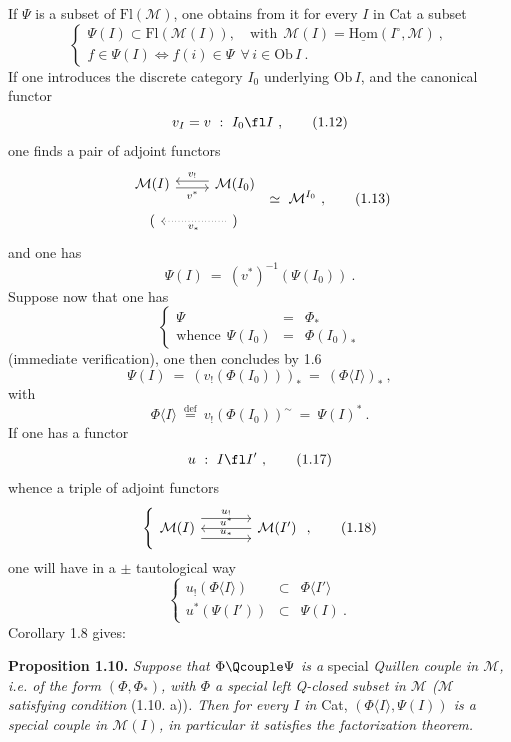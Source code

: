 If $\Psi$ is a subset of $\mathrm{Fl}(\mathcal{M})$, one obtains from it for every $I$ in Cat a subset
\[
\left\{
\begin{array}{l}
\Psi(I) \subset \mathrm{Fl}(\mathcal{M}(I)), \quad \text{with}\ \ \mathcal{M}(I) = \underline{\mathrm{Hom}}(I^{\circ}, \mathcal{M})\ , \\[1ex]
f \in \Psi(I) \iff f(i) \in \Psi \ \ \forall\, i \in \mathrm{Ob}\, I\ .
\end{array}
\right.
\tag*{(1.11)}
\]
If one introduces the discrete category $I_0$ underlying $\mathrm{Ob}\, I$, and the canonical functor
\[
v_I = v \ :\ I_0 \fl I\ , \tag*{(1.12)}
\]
one finds a pair of adjoint functors
\[
\begin{tikzcd}[row sep=small]
\mathcal{M}(I) \arrow[r, shift right=1, "v^{*}"'] & \mathcal{M}(I_0) \arrow[l, shift right=1, "v_{!}"'] \\
( & ) \arrow[l, dotted, "v_{*}"]
\end{tikzcd}
\ \simeq\ \mathcal{M}^{I_0}\ ,
\tag*{(1.13)}
\]
and one has
\[
\Psi(I) \ =\ (v^{*})^{-1}(\Psi(I_0))\ .
\]
Suppose now that one has
\[
\left\{
\begin{array}{rcl}
\Psi & = & \Phi_{*} \\[1ex]
\text{whence}\ \ \Psi(I_0) & = & \Phi(I_0)_{*}
\end{array}
\right.
\tag*{(1.14)}
\]
(immediate verification), one then concludes by 1.6
\[
\Psi(I) \ =\ (v_{!}(\Phi(I_0)))_{*} \ =\ (\Phi\langle I\rangle)_{*}\ , \tag*{(1.15)}
\]
with
\[
\Phi\langle I\rangle \ \overset{\text{def}}{=}\ v_{!}(\Phi(I_0))^{\sim} \ =\ \Psi(I)^{*}\ . \tag*{(1.16)}
\]
If one has a functor
\[
u \ :\ I \fl I'\ , \tag*{(1.17)}
\]
whence a triple of adjoint functors
\[
\left\{
\begin{tikzcd}[column sep=large]
\mathcal{M}(I) \arrow[r, shift left=3, "u_{!}"] \arrow[r, shift right=3, "u_{*}"] & \mathcal{M}(I') \arrow[l, "u^{*}"']
\end{tikzcd}
\right.
,
\tag*{(1.18)}
\]
one will have in a $\pm$ tautological way
\[
\left\{
\begin{array}{rcl}
u_{!}(\Phi\langle I\rangle) & \subset & \Phi\langle I'\rangle \\
u^{*}(\Psi(I')) & \subset & \Psi(I)\ .
\end{array}
\right.
\tag*{(1.19)}
\]
Corollary 1.8 gives:

\textbf{Proposition 1.10.} \textit{Suppose that $\Phi \Qcouple \Psi$ is a} special \textit{Quillen couple in $\mathcal{M}$, i.e. of the form $(\Phi, \Phi_{*})$, with $\Phi$ a special left Q-closed subset in $\mathcal{M}$ ($\mathcal{M}$ satisfying condition} (1.10. a))\textit{. Then for every $I$ in} Cat, \textit{$(\Phi\langle I\rangle, \Psi(I))$ is a special couple in $\mathcal{M}(I)$, in particular it satisfies the factorization theorem.}

